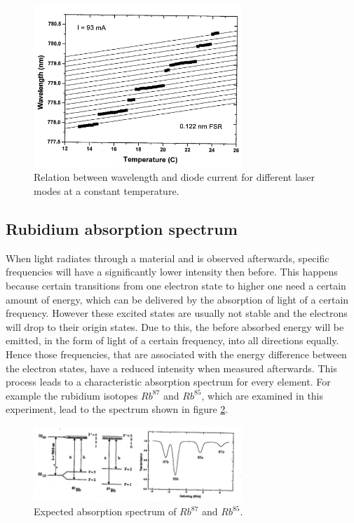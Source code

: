 \FloatBarrier
\begin{figure}
  \centering
  \includegraphics[width=0.7\textwidth]{medium_gain_temperature.png}
  \caption{Relation between wavelength and diode current
           for different laser modes at a constant temperature.}
  \label{fig:medium_gain_temperature}
\end{figure}
\FloatBarrier







\subsection{Rubidium absorption spectrum}
\label{subsec:rubidium}
When light radiates through a material
and is observed afterwards,
specific frequencies will have a significantly lower intensity then before.
This happens because certain transitions from one electron
state to higher one need a certain amount of energy, which
can be delivered by the absorption of light of a certain frequency.
However these excited states are usually not stable and the electrons
will drop to their origin states. Due to this, the before absorbed energy will be emitted,
in the form of light of a certain frequency, into all directions equally.
Hence those frequencies, that are associated with the
energy difference between the electron states,
have a reduced intensity when measured afterwards.
This process leads to a characteristic absorption spectrum for
every element. For example the rubidium isotopes $Rb^{87}$ and $Rb^{85}$, which are examined in
this experiment, lead to the spectrum shown in figure \ref{fig:rubidium_spectrum}.

\begin{figure}
  \centering
  \includegraphics[width=0.7\textwidth]{rubidium_spectrum.png}
  \caption{Expected absorption spectrum of $Rb^{87}$ and $Rb^{85}$.\cite{V61}}
  \label{fig:rubidium_spectrum}
\end{figure}


